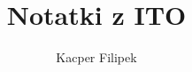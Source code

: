 \documentclass[12pt]{article}
\title{Notatki z ITO}
\author{Kacper Filipek}
\date{}
\begin{document}
\maketitle 








\pagebreak

\end{document}
